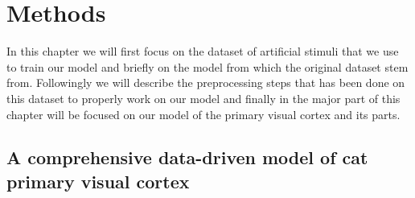 \chapter{Methods}
\label{chap:methods}
In this chapter we will first focus on the dataset of artificial stimuli that we use to train our model and briefly on the model from which the original dataset stem from. Followingly we will describe the preprocessing steps that has been done on this dataset to properly work on our model and finally in the major part of this chapter will be focused on our model of the primary visual cortex and its parts.

\section{A comprehensive data-driven model of cat primary visual cortex}
\label{sec:cats_v1_model}
